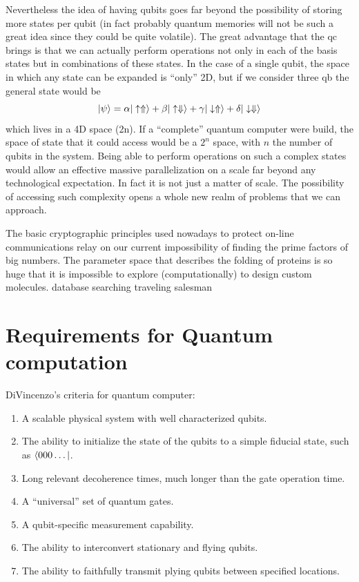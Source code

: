 Nevertheless the idea of having qubits goes far beyond the possibility of storing more states per qubit (in fact probably quantum memories will not be such a great idea since they could be quite volatile).
The great advantage that the \ac{qc} brings is that we can actually perform operations not only in each of the basis states but in combinations of these states\cite{DiVincenzo2000}. In the case of a single qubit, the space in which any state can be expanded is ``only'' 2D, but if we consider three \ac{qb} the general state would be
\begin{equation}
  |\psi\rangle = \alpha|\uparrow\Uparrow\rangle + \beta|\uparrow\Downarrow\rangle +
               \gamma|\downarrow\Uparrow\rangle + \delta|\downarrow\Downarrow\rangle
\end{equation}
which lives in a 4D space (2n).
If a ``complete'' quantum computer were build, the space of state that it could access would be a $2^n$ space, with $n$ the number of qubits in the system. Being able to perform operations on such a complex states would allow an effective massive parallelization on a scale far beyond any technological expectation.
In fact it is not just a matter of scale. The possibility of accessing such complexity opens a whole new realm of problems that we can approach.

The basic cryptographic principles used nowadays to protect on-line communications relay on our current impossibility of finding the prime factors of big numbers\cite{Shor1994}.
The parameter space that describes the folding of proteins is so huge that it is impossible to explore (computationally) to design custom molecules.\cite{Lanyon2009}
database searching\cite{Grover1997}
traveling salesman\cite{Goswami2004, Moylett2017}


\section{Requirements for Quantum computation}

DiVincenzo's criteria for quantum computer\cite{DiVincenzo2000}:
\begin{enumerate}
  \item A scalable physical system with well characterized qubits.
  \item The ability to initialize the state of the qubits to a simple fiducial state, such as $\langle000\dots|$.
  \item Long relevant decoherence times, much longer than the gate operation time.
  \item A ``universal'' set of quantum gates.
  \item A qubit-specific measurement capability.
  \item The ability to interconvert stationary and flying qubits.
  \item The ability to faithfully transmit plying qubits between specified locations.
\end{enumerate}




